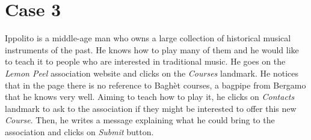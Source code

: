 \documentclass[../../DD.tex]{subfiles}
\begin{document}
\section{Case 3}

	Ippolito is a middle-age man who owns a large collection of historical musical instruments of the past. He knows how to play many of them and he would like to teach it to people who are interested in traditional music.
	\newline He goes on the \textit{Lemon Peel} association website and clicks on the \textit{Courses} landmark. He notices that in the page there is no reference to Baghèt courses, a bagpipe from Bergamo that he knows very well. Aiming to teach how to play it, he clicks on \textit{Contacts} landmark to ask to the association if they might be interested to offer this new \textit{Course}. Then, he writes a message explaining what he could bring to the association and clicks on \textit{Submit} button.
	
\end{document}
